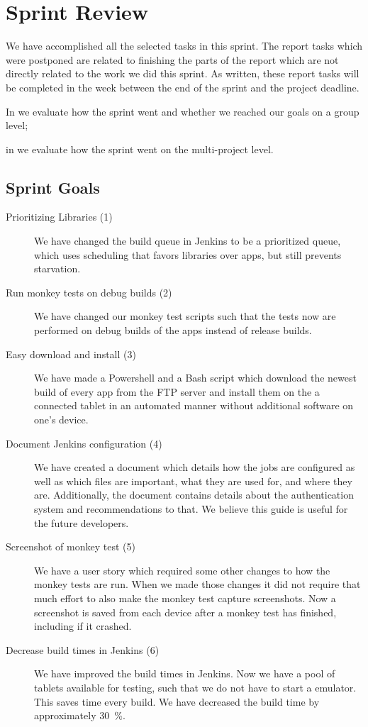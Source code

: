 \chapter{Sprint Review}\label{chap:sprint4_end}
We have accomplished all the selected tasks in this sprint. The report tasks which were postponed are related to finishing the parts of the report which are not directly related to the work we did this sprint. As written, these report tasks will be completed in the week between the end of the sprint and the project deadline.

\begin{chapterorganization}
    \item In  we evaluate how the sprint went and whether we reached our goals on a group level;
    \item in  we evaluate how the sprint went on the multi-project level.
\end{chapterorganization}

\section{Sprint Goals}\label{sec:s4_goals}
\begin{description}
    \item[Prioritizing Libraries (1)] We have changed the build queue in Jenkins to be a prioritized queue, which uses scheduling that favors libraries over apps, but still prevents starvation.
    \item[Run monkey tests on debug builds (2)] We have changed our monkey test scripts such that the tests now are performed on debug builds of the apps instead of release builds.
    \item[Easy download and install (3)] We have made a Powershell and a Bash script which download the newest build of every app from the FTP server and install them on the a connected tablet in an automated manner without additional software on one's device.
    \item[Document Jenkins configuration (4)] We have created a document which details how the jobs are configured as well as which files are important, what they are used for, and where they are. Additionally, the document contains details about the authentication system and recommendations to that. We believe this guide is useful for the future developers.
    \item[Screenshot of monkey test (5)] We have a user story which required some other changes to how the monkey tests are run. When we made those changes it did not require that much effort to also make the monkey test capture screenshots. Now a screenshot is saved from each device after a monkey test has finished, including if it crashed.
    \item[Decrease build times in Jenkins (6)] We have improved the build times in Jenkins. Now we have a pool of tablets available for testing, such that we do not have to start a emulator. This saves time every build. We have decreased the build time by approximately \SI{30}{\percent}.
\end{description}

